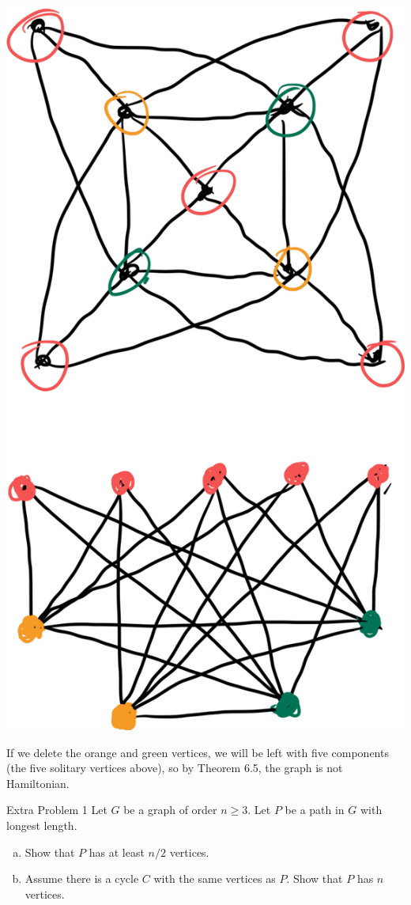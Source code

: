 \documentclass[10pt]{extarticle}
\begin{document}
\begin{problem}{11}
\begin{center}
      \includegraphics[scale=0.15]{6_11_sol.png}
    \end{center}
    If we delete the orange and green vertices, we will be left with five components (the five solitary vertices above), so by Theorem 6.5, the graph is not Hamiltonian.
  \end{problem}
  \begin{problem}{Extra Problem 1}
    Let $G$ be a graph of order $n\geq 3$. Let $P$ be a path in $G$ with longest length.
    \begin{enumerate}[(a)]
      \item Show that $P$ has at least $n/2$ vertices.
      \item Assume there is a cycle $C$ with the same vertices as $P$. Show that $P$ has $n$ vertices.
    \end{enumerate}
  \end{problem}
\end{document}
